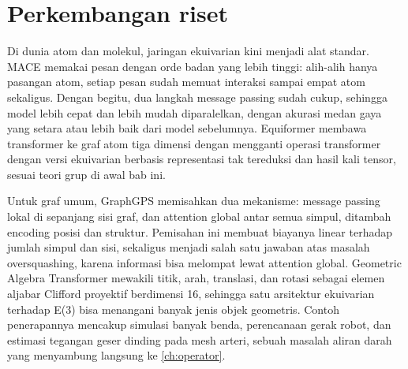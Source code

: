 \section{Perkembangan riset}

Di dunia atom dan molekul, jaringan ekuivarian kini menjadi alat standar. MACE \citep{batatia2022} memakai pesan dengan
orde badan yang lebih tinggi: alih-alih hanya pasangan atom, setiap pesan sudah memuat interaksi sampai empat atom
sekaligus. Dengan begitu, dua langkah message passing sudah cukup, sehingga model lebih cepat dan lebih mudah
diparalelkan, dengan akurasi medan gaya yang setara atau lebih baik dari model sebelumnya. Equiformer
\citep{liao2023equiformer} membawa transformer ke graf atom tiga dimensi dengan mengganti operasi transformer dengan versi
ekuivarian berbasis representasi tak tereduksi dan hasil kali tensor, sesuai teori grup di awal bab ini.

Untuk graf umum, GraphGPS \citep{rampasek2022} memisahkan dua mekanisme: message passing lokal di sepanjang sisi graf,
dan attention global antar semua simpul, ditambah encoding posisi dan struktur. Pemisahan ini membuat biayanya linear
terhadap jumlah simpul dan sisi, sekaligus menjadi salah satu jawaban atas masalah oversquashing, karena informasi bisa
melompat lewat attention global. Geometric Algebra Transformer \citep{brehmer2023} mewakili titik, arah, translasi, dan
rotasi sebagai elemen aljabar Clifford proyektif berdimensi 16, sehingga satu arsitektur ekuivarian terhadap E(3) bisa
menangani banyak jenis objek geometris. Contoh penerapannya mencakup simulasi banyak benda, perencanaan gerak robot,
dan estimasi tegangan geser dinding pada mesh arteri, sebuah masalah aliran darah yang menyambung langsung ke
\cref{ch:operator}.

